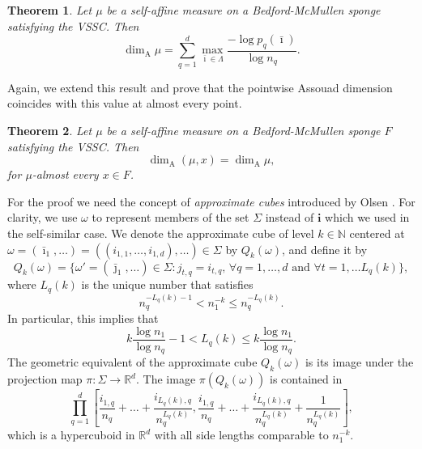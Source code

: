 \documentclass{PRM}
\newcommand{\field}[1]{\mathbb{#1}}
\newcommand{\N}{\field{N}}
\newcommand{\R}{\field{R}}
\theoremstyle{plain}
\newtheorem{thm}{Theorem}[section]
\theoremstyle{definition}
\theoremstyle{remark}
\begin{document}
\begin{thm}\label{thm:bm-formula}
Let $\mu$ be a self-affine measure on a Bedford-McMullen sponge satisfying the VSSC. Then
\begin{equation*}
    \dim_{\mathrm{A}}\mu=\sum_{q=1}^d\max_{\bar{\imath}\in \Lambda}\frac{-\log p_q(\bar{\imath})}{\log n_q}.
\end{equation*}
\end{thm}
Again, we extend this result and prove that the pointwise Assouad dimension coincides with this value at almost every point.

\begin{thm}\label{thm:bm_formula}
Let $\mu$ be a self-affine measure on a Bedford-McMullen sponge $F$ satisfying the VSSC. Then
\begin{equation*}
    \dim_{\mathrm{A}}(\mu,x)=\dim_{\mathrm{A}}\mu,
\end{equation*}
for $\mu$-almost every $x\in F$.
\end{thm}
For the proof we need the concept of \emph{approximate cubes} introduced by Olsen \cite{O}. For clarity, we use $\omega$ to represent members of the set $\Sigma$ instead of $\mathbf{i}$ which we used in the self-similar case. We denote the approximate cube of level $k\in\N$ centered at $\omega=(\bar{\imath}_1,\ldots)=((i_{1,1},\ldots,i_{1,d}),\ldots)\in\Sigma$ by $Q_k(\omega)$, and define it by
\begin{equation*}
    Q_k(\omega)=\{\omega'=(\bar{\jmath}_1,\ldots)\in\Sigma\colon j_{t,q}=i_{t,q},\,\forall q=1,\ldots,d\text{ and }\forall t=1,\ldots L_q(k)\},
\end{equation*}
where $L_q(k)$ is the unique number that satisfies
\begin{equation*}
   n_q^{-L_q(k)-1} <n_1^{-k}\leq n_q^{-L_q(k)}.
\end{equation*}
In particular, this implies that
\begin{equation*}
    k\frac{\log n_1}{\log n_q}-1< L_q(k)\leq k\frac{\log n_1}{\log n_q}.
\end{equation*}
The geometric equivalent of the approximate cube $Q_k(\omega)$ is its image under the projection map $\pi:\Sigma\to \R^d$. The image $\pi(Q_k(\omega))$ is contained in
\begin{equation*}
    \prod_{q=1}^d\left[\frac{i_{1,q}}{n_q}+\ldots+\frac{i_{L_q(k),q}}{n_q^{L_q(k)}},\frac{i_{1,q}}{n_q}+\ldots+\frac{i_{L_q(k),q}}{n_q^{L_q(k)}}+\frac{1}{n_q^{L_q(k)}}\right],
\end{equation*}
which is a hypercuboid in $\R^d$ with all side lengths comparable to $n_1^{-k}$.
\end{document}
